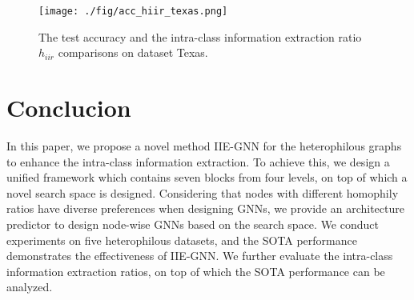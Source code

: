 \documentclass[sigconf]{acmart}
\begin{document}
\begin{figure}
	\centering
	\texttt{[image: ./fig/acc\_hiir\_texas.png]}
	\caption{The test accuracy and the intra-class information extraction ratio $h_{iir}$ comparisons on dataset Texas. }
	\label{fig-acc-hiir}
\end{figure}




\section{Conclucion}
In this paper, we propose a novel method IIE-GNN for the heterophilous graphs to enhance the intra-class information extraction. To achieve this, we design a unified framework which contains seven blocks from four levels, on top of which a novel search space is designed. Considering that nodes with different homophily ratios have diverse preferences when designing GNNs, we provide an architecture predictor to design node-wise GNNs based on the search space. We conduct experiments on five heterophilous datasets, and the SOTA performance demonstrates the effectiveness of IIE-GNN. We further evaluate the intra-class information extraction ratios, on top of which the SOTA performance can be analyzed.




\end{document}
